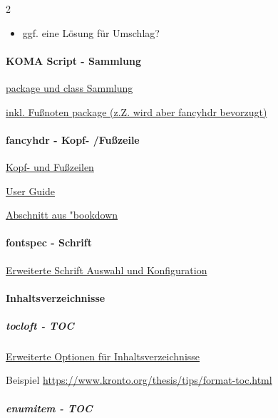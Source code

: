 \documentclass[
  a4paper,
  twoside]{article}
\providecommand{\tightlist}{%
  \setlength{\itemsep}{0pt}\setlength{\parskip}{0pt}}
\let\oldparagraph\paragraph
\renewcommand{\paragraph}[1]{\oldparagraph{#1}\mbox{}}
\let\oldsubparagraph\subparagraph
\renewcommand{\subparagraph}[1]{\oldsubparagraph{#1}\mbox{}}
\begin{document}
\begin {multicols}{2}
\begin{itemize}
\tightlist
\item
  ggf. eine Lösung für Umschlag?
\end{itemize}

\hypertarget{koma-script---sammlung}{%
\paragraph{KOMA Script - Sammlung}\label{koma-script---sammlung}}

\href{https://www.ctan.org/pkg/koma-script}{package und class Sammlung}

\href{https://ctan.org/pkg/scrlayer-scrpage?lang=de}{inkl. Fußnoten package (z.Z. wird aber fancyhdr bevorzugt)}

\hypertarget{fancyhdr---kopf--fuuxdfzeile}{%
\paragraph{fancyhdr - Kopf- /Fußzeile}\label{fancyhdr---kopf--fuuxdfzeile}}

\href{https://ctan.org/pkg/fancyhdr?lang=de}{Kopf- und Fußzeilen}

\href{http://tug.ctan.org/tex-archive/macros/latex/contrib/fancyhdr/fancyhdr.pdf}{User Guide}

\href{https://bookdown.org/yihui/rmarkdown-cookbook/latex-header.html}{Abschnitt aus "bookdown}

\hypertarget{fontspec---schrift}{%
\paragraph{fontspec - Schrift}\label{fontspec---schrift}}

\href{https://www.ctan.org/pkg/fontspec}{Erweiterte Schrift Auswahl und Konfiguration}

\hypertarget{inhaltsverzeichnisse}{%
\paragraph{Inhaltsverzeichnisse}\label{inhaltsverzeichnisse}}

\hypertarget{tocloft---toc}{%
\subparagraph{tocloft - TOC}\label{tocloft---toc}}

\href{https://www.ctan.org/pkg/tocloft}{Erweiterte Optionen für Inhaltsverzeichnisse}

Beispiel \url{https://www.kronto.org/thesis/tips/format-toc.html}

\hypertarget{enumitem---toc}{%
\subparagraph{enumitem - TOC}\label{enumitem---toc}}


\end{multicols}
\end{document}
